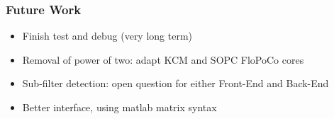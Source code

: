 \begin{frame}
	\frametitle{Future Work}
	\begin{itemize}
		\item Finish test and debug (very long term)
		\item Removal of power of two: adapt KCM and SOPC FloPoCo cores
		\item Sub-filter detection: open question for either Front-End and Back-End
		\item Better interface, using matlab matrix syntax
	\end{itemize}
\end{frame}
